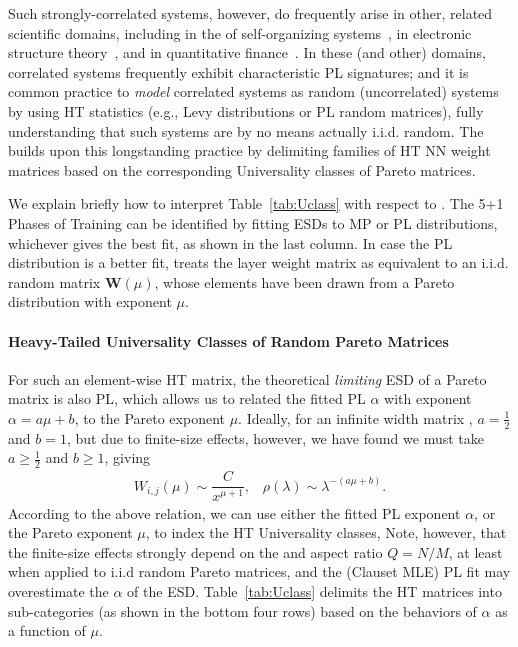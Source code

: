 Such strongly-correlated systems, however, do frequently arise in other, related scientific domains, including
in the \STATMECH of self-organizing systems~\cite{bak97a,SornetteBook}, 
in electronic structure theory~\cite{Martin1996,Martin1998,Martin1996_CPL}, and
in quantitative finance~\cite{bouchaud1999,bouchaud2005,potters_bouchaud_2020}. 
In these (and other) domains, correlated systems frequently exhibit characteristic PL signatures; and it is common practice to \emph{model} correlated systems as random (uncorrelated) systems by using HT statistics (e.g., Levy distributions or PL random matrices), fully understanding that such systems are by no means actually i.i.d. random.
The \HTSR \Phenomenology builds upon this longstanding practice by 
delimiting families of HT NN weight matrices based on the corresponding Universality classes of Pareto matrices. 

We explain briefly how to interpret Table~\ref{tab:Uclass} with respect to \HTRMT. The 5+1 Phases of Training can be 
identified by fitting ESDs to MP or PL distributions, whichever gives the best fit, as shown in the last column.
In case the PL distribution is a better fit, \HTSR \Phenomenology treats the layer weight matrix as 
equivalent to an i.i.d. random matrix $\mathbf{W}(\mu)$, whose elements have been drawn from a Pareto distribution 
with exponent $\mu$. 

\paragraph{Heavy-Tailed Universality Classes of Random Pareto Matrices}
For such an element-wise HT matrix, the theoretical \emph{limiting} ESD of a Pareto matrix is also PL,
which allows us to related the fitted PL $\alpha$ with exponent $\alpha=a\mu+b$, to the Pareto exponent $\mu$.
Ideally, for an infinite width matrix ,  $a=\tfrac{1}{2}$ and $b=1$, but due to finite-size effects, however,
we have found we must take $a\ge \tfrac{1}{2}$ and $b\ge 1$, giving
\begin{align}
W_{i,j}(\mu)\sim\dfrac{C}{x^{\mu +1}},\;\;\;\rho(\lambda)\sim\lambda^{-(a\mu+b)}.
\end{align}
According to the above relation, 
we can use either the fitted PL exponent $\alpha$, or the Pareto exponent $\mu$,
to index the HT Universality classes,
Note, however, that the finite-size effects strongly depend on  the and aspect ratio  $Q=N/M$,
at least when applied to i.i.d random Pareto matrices, and 
the (Clauset MLE) PL fit may overestimate the $\alpha$ of the ESD.
Table~\ref{tab:Uclass} delimits the HT matrices 
into sub-categories (as shown in the bottom four rows)  based on the behaviors of $\alpha$ as a function of $\mu$.

